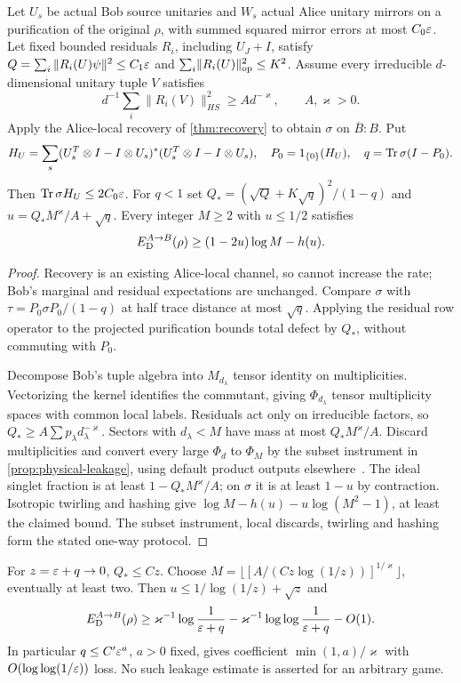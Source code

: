 \begin{proposition}\label{prop:source-leakage-floor}
Let $U_s$ be actual Bob source unitaries and $W_s$ actual Alice unitary mirrors on a purification of the original $\rho$, with summed squared mirror errors at most $C_0\varepsilon$. Let fixed bounded residuals $R_i$, including $U_J+I$, satisfy $Q=\sum_i\|R_i(U)\psi\|^2\le C_1\varepsilon$ and $\sum_i\lVert R_i(U)\rVert_{\mathrm{op}}^2\le K^2$. Assume every irreducible $d$-dimensional unitary tuple $V$ satisfies
\[
 d^{-1}\sum_i\|R_i(V)\|_{HS}^2\ge A d^{-\varkappa},\qquad A,\varkappa>0.
\]
Apply the Alice-local recovery of \cref{thm:recovery} to obtain $\sigma$ on $\overline B:B$. Put
\[
 H_U=\sum_s(U_s^T\otimes I-I\otimes U_s)^*(U_s^T\otimes I-I\otimes U_s),\quad
 P_0=1_{\{0\}}(H_U),\quad q=\operatorname{Tr}\sigma(I-P_0).
\]
Then $\operatorname{Tr}\sigma H_U\le2C_0\varepsilon$. For $q<1$ set $Q_*=(\sqrt Q+K\sqrt q)^2/(1-q)$ and $u=Q_*M^\varkappa/A+\sqrt q$. Every integer $M\ge2$ with $u\le1/2$ satisfies
\[
 E_{\mathrm D}^{A\to B}(\rho)\ge(1-2u)\log M-h(u).
\]
\end{proposition}
\begin{proof}
Recovery is an existing Alice-local channel, so cannot increase the rate; Bob's marginal and residual expectations are unchanged. Compare $\sigma$ with $\tau=P_0\sigma P_0/(1-q)$ at half trace distance at most $\sqrt q$. Applying the residual row operator to the projected purification bounds total defect by $Q_*$, without commuting with $P_0$.

Decompose Bob's tuple algebra into $M_{d_\lambda}$ tensor identity on multiplicities. Vectorizing the kernel identifies the commutant, giving $\Phi_{d_\lambda}$ tensor multiplicity spaces with common local labels. Residuals act only on irreducible factors, so $Q_*\ge A\sum p_\lambda d_\lambda^{-\varkappa}$. Sectors with $d_\lambda<M$ have mass at most $Q_*M^\varkappa/A$. Discard multiplicities and convert every large $\Phi_d$ to $\Phi_M$ by the subset instrument in \cref{prop:physical-leakage}, using default product outputs elsewhere~\cite{Nie99}. The ideal singlet fraction is at least $1-Q_*M^\varkappa/A$; on $\sigma$ it is at least $1-u$ by contraction. Isotropic twirling and hashing give $\log M-h(u)-u\log(M^2-1)$, at least the claimed bound. The subset instrument, local discards, twirling and hashing form the stated one-way protocol.
\end{proof}

For $z=\varepsilon+q\to0$, $Q_*\le Cz$. Choose $M=\lfloor[A/(Cz\log(1/z))]^{1/\varkappa}\rfloor$, eventually at least two. Then $u\le1/\log(1/z)+\sqrt z$ and
\[
 E_{\mathrm D}^{A\to B}(\rho)\ge\varkappa^{-1}\log\frac1{\varepsilon+q}
 -\varkappa^{-1}\log\log\frac1{\varepsilon+q}-O(1).
\]
In particular $q\le C'\varepsilon^a$, $a>0$ fixed, gives coefficient $\min(1,a)/\varkappa$ with $O(\log\log(1/\varepsilon))$ loss. No such leakage estimate is asserted for an arbitrary game.

